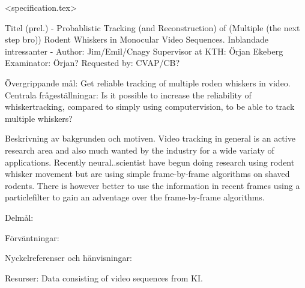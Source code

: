 
<specification.tex>

Titel (prel.) - Probablistic Tracking (and Reconstruction) of (Multiple (the next step bro)) Rodent Whiskers in Monocular Video Sequences.
Inblandade intressanter -   Author: Jim/Emil/Cnagy
                            Supervisor at KTH: Örjan Ekeberg
                            Examinator: Örjan?
                            Requested by: CVAP/CB?

Övergrippande mål:
    Get reliable tracking of multiple roden whiskers in video.
Centrala frågeställningar:
    Is it possible to increase the reliability of whiskertracking, compared to simply using computervision, to be able to track multiple whiskers?

Beskrivning av bakgrunden och motiven.
    Video tracking in general is an active research area and also much wanted by the industry for a wide variaty of applications.
    Recently neural..scientist have begun doing research using rodent whisker movement but are using simple frame-by-frame algorithms on shaved rodents.
    There is however better to use the information in recent frames using a particlefilter to gain an adventage over the frame-by-frame algorithms.
 

Delmål:


Förväntningar:


Nyckelreferenser och hänvisningar:


Resurser:
   Data consisting of video sequences from KI.


